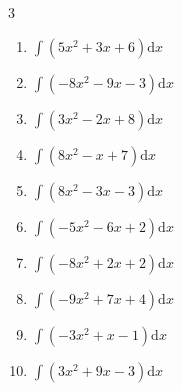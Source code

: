 \begin{multicols}{3}
\begin{enumerate}

\columnbreak %

  \item $\displaystyle \int \left( 5x^{2}+3x+6 \right) \mathrm{d}x$


  \item $\displaystyle \int \left( -8x^{2}-9x-3 \right) \mathrm{d}x$


  \item $\displaystyle \int \left( 3x^{2}-2x+8 \right) \mathrm{d}x$


  \item $\displaystyle \int \left( 8x^{2}-x+7 \right) \mathrm{d}x$


  \item $\displaystyle \int \left( 8x^{2}-3x-3 \right) \mathrm{d}x$


  \item $\displaystyle \int \left( -5x^{2}-6x+2 \right) \mathrm{d}x$


  \item $\displaystyle \int \left( -8x^{2}+2x+2 \right) \mathrm{d}x$


  \item $\displaystyle \int \left( -9x^{2}+7x+4 \right) \mathrm{d}x$


  \item $\displaystyle \int \left( -3x^{2}+x-1 \right) \mathrm{d}x$


  \item $\displaystyle \int \left( 3x^{2}+9x-3 \right) \mathrm{d}x$


\end{enumerate}
\end{multicols}
